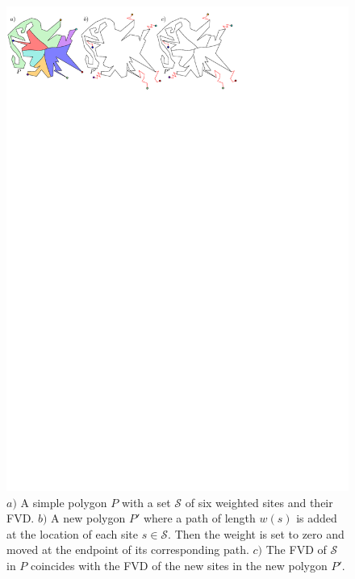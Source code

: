 \documentclass[a4paper,UKenglish]{socg-lipics-v2018}
\newcommand{\s}{\mathcal S}
\begin{document}
\begin{figure}[t]
\centering
\includegraphics{imgIntroVoronoi.pdf}
\caption{$a)$ A simple polygon $P$ with a set $\s$ of six weighted sites and their FVD. $b)$ A new polygon $P'$ where a path of length $w(s)$ is added at the location of each site $s\in \s$. Then the weight is set to zero and moved at the endpoint of its corresponding path.
$c)$ The FVD of $\s$ in $P$ coincides with the FVD of the new sites in the new polygon $P'$.}
\label{fig:WeightsNotHarder}
\end{figure}
\end{document}
